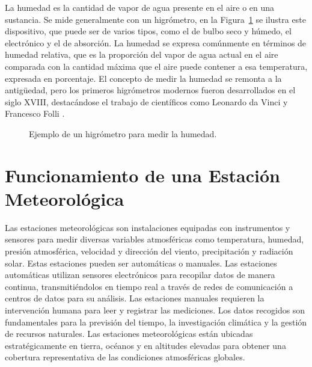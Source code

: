 \documentclass[
  us-letterpaper,
]{scrreprt}
\theoremstyle{plain}
\theoremstyle{definition}
\theoremstyle{definition}
\theoremstyle{remark}
\begin{document}
La humedad es la cantidad de vapor de agua presente en el aire o en una
sustancia. Se mide generalmente con un higrómetro, en la
Figura~\ref{fig-higro} se ilustra este dispositivo, que puede ser de
varios tipos, como el de bulbo seco y húmedo, el electrónico y el de
absorción. La humedad se expresa comúnmente en términos de humedad
relativa, que es la proporción del vapor de agua actual en el aire
comparada con la cantidad máxima que el aire puede contener a esa
temperatura, expresada en porcentaje. El concepto de medir la humedad se
remonta a la antigüedad, pero los primeros higrómetros modernos fueron
desarrollados en el siglo XVIII, destacándose el trabajo de científicos
como Leonardo da Vinci y Francesco Folli .

\begin{figure}


\caption{\label{fig-higro}Ejemplo de un higrómetro para medir la
humedad.}

\end{figure}%

\section{Funcionamiento de una Estación
Meteorológica}\label{funcionamiento-de-una-estaciuxf3n-meteoroluxf3gica}

Las estaciones meteorológicas son instalaciones equipadas con
instrumentos y sensores para medir diversas variables atmosféricas como
temperatura, humedad, presión atmosférica, velocidad y dirección del
viento, precipitación y radiación solar. Estas estaciones pueden ser
automáticas o manuales. Las estaciones automáticas utilizan sensores
electrónicos para recopilar datos de manera continua, transmitiéndolos
en tiempo real a través de redes de comunicación a centros de datos para
su análisis. Las estaciones manuales requieren la intervención humana
para leer y registrar las mediciones. Los datos recogidos son
fundamentales para la previsión del tiempo, la investigación climática y
la gestión de recursos naturales. Las estaciones meteorológicas están
ubicadas estratégicamente en tierra, océanos y en altitudes elevadas
para obtener una cobertura representativa de las condiciones
atmosféricas globales.
\end{document}
